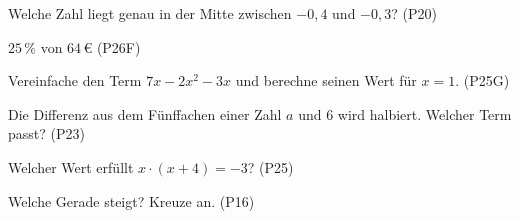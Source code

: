 \documentclass[11pt]{article}
\begin{document}
\small

\begin{aufgabe}{Welche Zahl liegt genau in der Mitte zwischen $-0{,}4$ und $-0{,}3$? \hfill (P20) \\ \leerfeld}
\end{aufgabe}

\begin{aufgabe}{$25\,\%$ von $64\,€$ \hfill (P26F) \\ \leerfeld[€]}
\end{aufgabe}

\begin{aufgabe}{Vereinfache den Term $7x - 2x^2 - 3x$ und berechne seinen Wert für $x = 1$. \hfill (P25G)}
\end{aufgabe}

\begin{aufgabe}{Die Differenz aus dem Fünffachen einer Zahl $a$ und 6 wird halbiert. Welcher Term passt? \hfill (P23) \\    }
\end{aufgabe}

\begin{aufgabe}{Welcher Wert erfüllt $x \cdot (x + 4) = -3$? \hfill (P25) \\    }
\end{aufgabe}

\begin{aufgabe}{\begin{minipage}[t]{0.6\linewidth}Welche Gerade steigt? Kreuze an. \hfill (P16) \\  \end{minipage}\hfill\begin{minipage}[t]{0.37\linewidth}\vspace{0pt}
\begin{ksys}[xmin=-5,xmax=5,ymin=-5,ymax=5,klein]   \end{ksys}
\end{minipage}}
\end{aufgabe}
\end{document}
